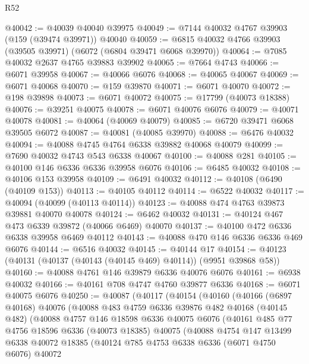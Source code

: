 \begin{lexlean}{R52}
\begin{coremodule}
@40042 := @40039 @40040 @39975
@40049 := @7144 @40032 @4767 @39903 (@159 (@39474 @39971)) @40040
@40059 := @6815 @40032 @4766 @39903 (@39505 @39971) (@6072 (@6804 @39471 @6068 @39970))
@40064 := @7085 @40032 @2637 @4765 @39883 @39902
@40065 := @7664 @4743
@40066 := @6071 @39958
@40067 := @40066 @6076
@40068 := @40065 @40067
@40069 := @6071 @40068
@40070 := @159 @39870
@40071 := @6071 @40070
@40072 := @198 @39898
@40073 := @6071 @40072
@40075 := @17799 (@40073 @18388)
@40076 := @39251 @40075
@40078 := @6071 @40076 @6076
@40079 := @40071 @40078
@40081 := @40064 (@40069 @40079)
@40085 := @6720 @39471 @6068 @39505 @6072
@40087 := @40081 (@40085 @39970)
@40088 := @6476 @40032
@40094 := @40088 @4745 @4764 @6338 @39882 @40068 @40079
@40099 := @7690 @40032 @4743 @543 @6338 @40067
@40100 := @40088 @281
@40105 := @40100 @146 @6336 @6336 @39958 @6076
@40106 := @6485 @40032
@40108 := @40106 @153 @39958
@40109 := @6491 @40032
@40112 := @40108 (@6490 (@40109 @153))
@40113 := @40105 @40112
@40114 := @6522 @40032
@40117 := @40094 (@40099 (@40113 @40114))
@40123 := @40088 @474 @4763 @39873 @39881 @40070 @40078
@40124 := @6462 @40032
@40131 := @40124 @467 @473 @6339 @39872 (@40066 @6469) @40070
@40137 := @40100 @472 @6336 @6338 @39958 @6469 @40112
@40143 := @40088 @470 @146 @6336 @6336 @469 @6076
@40144 := @6516 @40032
@40145 := @40144 @17
@40154 := @40123 (@40131 (@40137 (@40143 (@40145 @469) @40114)) (@9951 @39868 @58))
@40160 := @40088 @4761 @146 @39879 @6336 @40076 @6076
@40161 := @6938 @40032
@40166 := @40161 @708 @4747 @4760 @39877 @6336
@40168 := @6071 @40075 @6076
@40250 := @40087
    (@40117
      (@40154
        (@40160
          (@40166
            (@6897 @40168)
            @40076
            (@40088
              @483
              @4759
              @6336
              @39876
              @482
              @40168
              (@40145 @482)
              (@40088
                @4757
                @146
                @18598
                @6336
                @40075
                @6076
                (@40161
                  @485
                  @77
                  @4756
                  @18596
                  @6336
                  (@40073 @18385)
                  @40075
                  (@40088
                    @4754
                    @147
                    @13499
                    @6338
                    @40072
                    @18385
                    (@40124
                      @785
                      @4753
                      @6338
                      @6336
                      (@6071 @4750 @6076)
                      @40072

\end{coremodule}
\end{lexlean}
